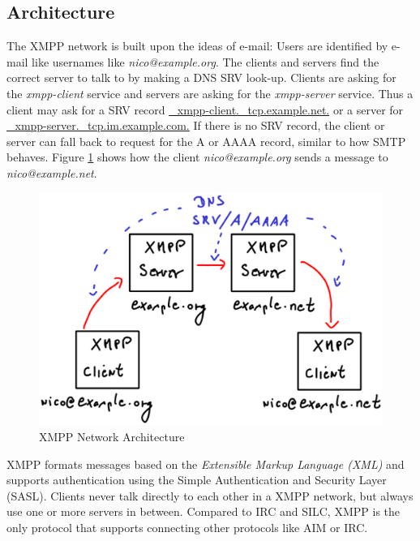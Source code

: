 \subsection{Architecture}
The XMPP network is built upon the ideas of e-mail: Users are identified
by e-mail like usernames like \textit{nico@example.org}. The clients and
servers find the correct server to talk to by making a
DNS SRV\cite{rfc2782} look-up. 
Clients are asking for the \textit{xmpp-client} service and
servers are asking for the \textit{xmpp-server} service.
Thus a client may ask for a SRV record
\url{_xmpp-client._tcp.example.net.} or a server for
\url{_xmpp-server._tcp.im.example.com.}
If there is no SRV record, the client or server can fall back
to request for the A or AAAA record, similar to how 
SMTP\cite{rfc2821} behaves. Figure \ref{jabberarch} shows
how the client \textit{nico@example.org} sends a message
to \textit{nico@example.net}.
\begin{figure}
    \centering
    \caption{XMPP Network Architecture}
    \label{jabberarch}
    \includegraphics[scale=0.8]{jabberarch.eps}
\end{figure}
XMPP formats messages based on the 
\textit{Extensible Markup Language (XML)} and
supports authentication using the
Simple Authentication and Security Layer (SASL)\cite{rfc4422}.
Clients never talk directly to each other in a XMPP network, but
always use one or more servers in between. Compared to IRC and SILC,
XMPP is the only protocol that supports connecting other protocols
like AIM or IRC.

